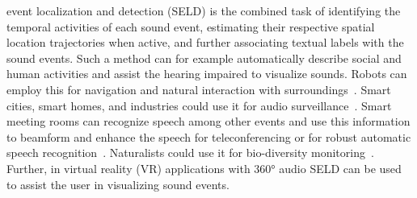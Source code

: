 \documentclass[journal]{IEEEtran}
\begin{document}
 event localization and detection (SELD) is the combined task of identifying the temporal activities of each sound event, estimating their respective spatial location trajectories when active, and further associating textual labels with the sound events. Such a method can for example automatically describe social and human activities and assist the hearing impaired to visualize sounds. Robots can employ this for navigation and natural interaction with surroundings~\cite{Takeda2016_single,Takeda2016_double,Yalta2017,He2018}. Smart cities, smart homes, and industries could use it for audio surveillance~\cite{surveillance_audio, Grobler2017, Wessels2017, Foggia_TITS2015}. Smart meeting rooms can recognize speech among other events and use this information to beamform and enhance the speech for teleconferencing or for robust automatic speech recognition~\cite{busso2005smart, Wang1997,Woelfel2009,ghoshal2014,Butko2011}. Naturalists could use it for bio-diversity monitoring~\cite{environmentalSED,Marques2012,Furnas2014}. Further, in virtual reality (VR) applications with \ang{360} audio SELD can be used to assist the user in visualizing sound events.
\end{document}
